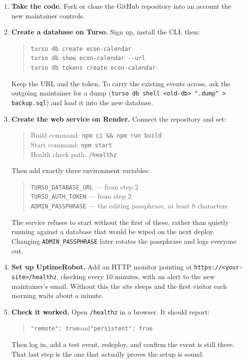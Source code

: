 \documentclass[11pt,a4paper]{article}
\newcommand{\code}[1]{\texttt{\small #1}}
\begin{document}
\begin{enumerate}
  \item \textbf{Take the code.} Fork or clone the GitHub repository into an
        account the new maintainer controls.

  \item \textbf{Create a database on Turso.} Sign up, install the CLI, then:
        \begin{quote}
        \code{turso db create econ-calendar}\\
        \code{turso db show econ-calendar -{}-url}\\
        \code{turso db tokens create econ-calendar}
        \end{quote}
        Keep the URL and the token. To carry the existing events across, ask
        the outgoing maintainer for a dump
        (\code{turso db shell <old-db> ".dump" > backup.sql}) and load it into
        the new database.

  \item \textbf{Create the web service on Render.} Connect the repository and
        set:
        \begin{quote}
        Build command: \code{npm ci \&\& npm run build}\\
        Start command: \code{npm start}\\
        Health check path: \code{/healthz}
        \end{quote}
        Then add exactly three environment variables:
        \begin{quote}
        \code{TURSO\_DATABASE\_URL} — from step 2\\
        \code{TURSO\_AUTH\_TOKEN} — from step 2\\
        \code{ADMIN\_PASSPHRASE} — the editing passphrase, at least 8 characters
        \end{quote}
        The service refuses to start without the first of these, rather than
        quietly running against a database that would be wiped on the next
        deploy. Changing \code{ADMIN\_PASSPHRASE} later rotates the passphrase
        and logs everyone out.

  \item \textbf{Set up UptimeRobot.} Add an HTTP monitor pointing at
        \code{https://<your-site>/healthz}, checking every 10 minutes, with an
        alert to the new maintainer's email. Without this the site sleeps and
        the first visitor each morning waits about a minute.

  \item \textbf{Check it worked.} Open \code{/healthz} in a browser. It should
        report:
        \begin{quote}
        \code{"remote": true}\quad and\quad \code{"persistent": true}
        \end{quote}
        Then log in, add a test event, redeploy, and confirm the event is still
        there. That last step is the one that actually proves the setup is
        sound.
\end{enumerate}
\end{document}
